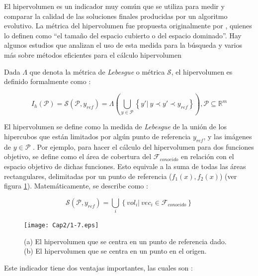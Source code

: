   El hipervolumen es un indicador muy com\'un que se utiliza para medir y comparar la calidad de las soluciones
  finales producidas por un algoritmo evolutivo. La m\'etrica del hipervolumen fue propuesta originalmente por
  \cite{Zitzler98on}, quienes lo definen como ``el tama\~no del espacio cubierto o del espacio dominado''. Hay algunos 
  estudios que analizan el uso de esta medida para la b\'usqueda \DIFdelbegin {}\DIFdelend \DIFaddbegin {}\DIFaddend y varios m\'as sobre m\'etodos eficientes para 
  el c\'alculo \DIFdelbegin {}\DIFdelend hipervolumen \cite{FonPaqhypervolume, BeuFon2009, Emmerich05anemo}

   \begin{definicion}  Dada $\Lambda$ que denota la m\'etrica de \textit{Lebesgue} 
   o m\'etrica $\mathcal{S}$, el hipervolumen es definido formalmente como \cite{EASMC}:

  \[
  I_h\left(\mathcal{P}\right) = \mathcal{S}(\mathcal{P},y_{ref}) = \Lambda \left(\bigcup_{y \in \mathcal{P}} \left\{ y' |~ y \prec y' \prec y_{ref} \right\} \right), 
  \mathcal{P} \subseteq \mathbb{R}^m
  \]

  El hipervolumen se define como la medida de \textit{Lebesgue} de la uni\'on de los hipercubos que est\'an limitados 
  por alg\'un punto de referencia $y_{ref}$, y las im\'agenes de $y \in \mathcal{P}$ \cite{zbt2006}. Por ejemplo,  para hacer el  
  c\'alculo del hipervolumen para dos funciones objetivo, se define como el \'area de cobertura del 
  $\mathcal{F}_{conocido}$ en  relaci\'on con el espacio objetivo de dichas funciones. Esto equivale a la suma de todas las \'areas 
  rectangulares, delimitadas por un punto de referencia ($f_1\left(x \right), f_2\left(x\right)$) (ver figura \ref{fig:hipervol}). 
  Matem\'aticamente, se describe como \cite{EASMC}:

 \[
  \mathcal{S}(\mathcal{P},y_{ref}) = \bigcup_{i} \left\{vol_i |~ vec_i \in \mathcal{F}_{conocido} \right\}
  \]
  \end{definicion}

 \begin{figure}
	\centering
	\texttt{[image: Cap2/1-7.eps]}
	  \caption [Hipervolumen por punto de referencia]{(a) El hipervolumen que se centra en un punto de referencia dado. 
	  (b) El hipervolumen que se centra en un punto en el origen.}
      \label{fig:hipervol}
      \end{figure}

  Este indicador tiene dos ventajas importantes, las cuales son \cite{zbt2006}:

